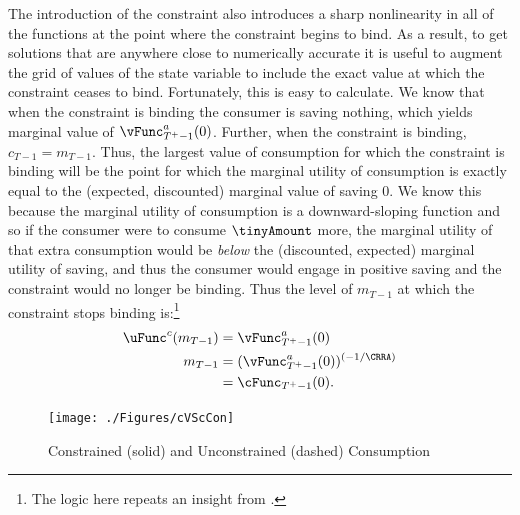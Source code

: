 \documentclass[titlepage, headings=optiontotocandhead]{\econtex}
\begin{document}

The introduction of the constraint also introduces a sharp
nonlinearity in all of the functions at the point where the constraint
begins to bind.  As a result, to get solutions that are anywhere close
to numerically accurate it is useful to augment the grid of values of
the state variable to include the exact value at which the constraint
ceases to bind.  Fortunately, this is easy to calculate.  We know that
when the constraint is binding the consumer is saving nothing, which
yields marginal value of $\vFunc^{{a}}_{T^{+}-1}(0)$. Further, when the
constraint is binding, ${c}_{T-1} = {m}_{T-1}$.  Thus, the largest
value of consumption for which the constraint is binding will be the
point for which the marginal utility of consumption is exactly equal
to the (expected, discounted) marginal value of saving 0.  We know
this because the marginal utility of consumption is a downward-sloping
function and so if the consumer were to consume $\tinyAmount$ more,
the marginal utility of that extra consumption would be \textit{below}
the (discounted, expected) marginal utility of saving, and thus the
consumer would engage in positive saving and the constraint would no
longer be binding.  Thus the level of ${m}_{T-1}$ at which the
constraint stops binding is:\footnote{The logic here repeats an insight from \cite{deatonLiqConstr}.}
\begin{equation}\begin{gathered}\begin{aligned}
      \uFunc^{{c}}({m}_{T-1})  & = \vFunc^{{a}}_{T^{+}-1}(0)  \nonumber \\
      {m}_{T-1}  & = (\vFunc^{{a}}_{T^{+}-1}(0))^{(-1/\CRRA)}  \nonumber
      \\        & = \cFunc_{T^{+}-1}(0). \label{eq:LCbindsTm1}
    \end{aligned}\end{gathered}\end{equation}

\hypertarget{cVScCon}{}
\begin{figure}
  \texttt{[image: ./Figures/cVScCon]}
  \caption{Constrained (solid) and Unconstrained (dashed) Consumption}
  \label{fig:cVScCon}
\end{figure}
\end{document}
